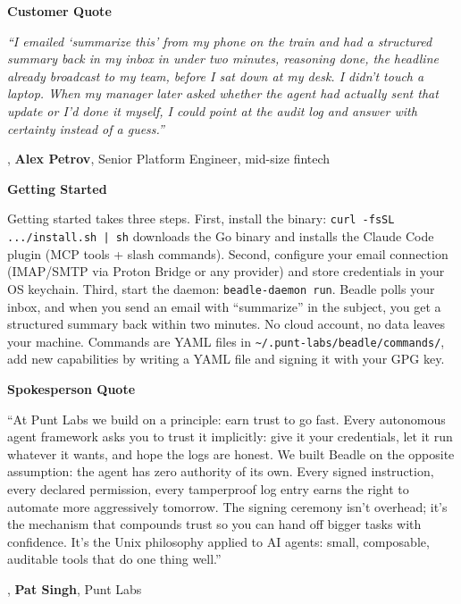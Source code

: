 \documentclass[11pt,letterpaper]{article}
\newcommand{\prsection}[1]{%
  \vspace{1em}%
  {\large\bfseries\color{SectionBlue}#1}%
  \vspace{0.3em}\par%
}
\begin{document}
\prsection{Customer Quote}

\begin{customerquote}
\textit{``I emailed `summarize this' from my phone on the train and had a
structured summary back in my inbox in under two minutes, reasoning
done, the headline already broadcast to my team, before I sat down at my
desk. I didn't touch a laptop. When my manager later asked whether the
agent had actually sent that update or I'd done it myself, I could point
at the audit log and answer with certainty instead of a guess.''}

\raggedleft, \textbf{Alex Petrov}, Senior Platform Engineer, mid-size
fintech
\end{customerquote}

\prsection{Getting Started}

Getting started takes three steps. First, install the binary:
{\small\texttt{curl -fsSL .../install.sh | sh}} downloads the Go binary
and installs the Claude Code plugin (MCP tools + slash commands). Second,
configure your email connection (IMAP/SMTP via Proton Bridge or any
provider) and store credentials in your OS keychain. Third, start the
daemon: {\small\texttt{beadle-daemon run}}. Beadle polls your inbox,
and when you send an email with ``summarize'' in the subject, you get
a structured summary back within two minutes. No cloud account, no data
leaves your machine. Commands are YAML files in
{\small\texttt{\textasciitilde/.punt-labs/beadle/commands/}}, add new
capabilities by writing a YAML file and signing it with your GPG key.

\prsection{Spokesperson Quote}

\begin{spokespersonquote}
``At Punt Labs we build on a principle: earn trust to go fast.
Every autonomous agent framework asks you to trust it implicitly: give it
your credentials, let it run whatever it wants, and hope the logs are honest.
We built Beadle on the opposite assumption: the agent has zero authority
of its own. Every signed instruction, every declared permission, every
tamperproof log entry earns the right to automate more aggressively tomorrow.
The signing ceremony isn't overhead; it's the mechanism that compounds trust
so you can hand off bigger tasks with confidence. It's the Unix philosophy
applied to AI agents: small, composable, auditable tools that do one thing
well.''

\raggedleft, \textbf{Pat Singh}, Punt Labs
\end{spokespersonquote}
\end{document}
